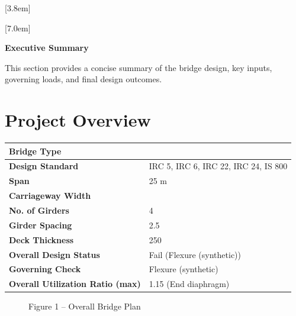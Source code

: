 \documentclass[12pt,a4paper]{report}
\numberwithin{table}{chapter}
\numberwithin{figure}{chapter}
\begin{document}
[3.8em]
  {\normalfont}
  {\contentslabel{2.3em}}
  {\hspace*{-2.3em}}
  {\hfill\contentspage}

[7.0em]
  {\normalfont}
  {\contentslabel{3.2em}}
  {\hspace*{-3.2em}}
  {\hfill\contentspage}

\newpage
\renewcommand{\contentsname}{\centering\Large\bfseries Table of Contents}
\tableofcontents


\newpage
{\centering\Large\bfseries Executive Summary\par}
\vspace{0.8em}

This section provides a concise summary of the bridge design, key inputs, governing loads, and final design outcomes.

\section*{Project Overview}
\label{sec:project-overview}


\begin{tabular}{|L{5.5cm}|L{8.5cm}|}
\hline
\textbf{Bridge Type} &  \\
\hline
\textbf{Design Standard} & IRC 5, IRC 6, IRC 22, IRC 24, IS 800 \\
\hline
\textbf{Span} & 25 m \\
\hline
\textbf{Carriageway Width} &  \\
\hline
\textbf{No. of Girders} & 4 \\
\hline
\textbf{Girder Spacing} & 2.5 \\
\hline
\textbf{Deck Thickness} & 250 \\
\hline
\textbf{Overall Design Status} & Fail (Flexure (synthetic)) \\
\hline
\textbf{Governing Check} & Flexure (synthetic) \\
\hline
\textbf{Overall Utilization Ratio (max)} & 1.15 (End diaphragm) \\
\hline
\end{tabular}


\begin{figure}[H]
\centering
{}
\caption*{Figure 1 -- Overall Bridge Plan}
\end{figure}
\end{document}
